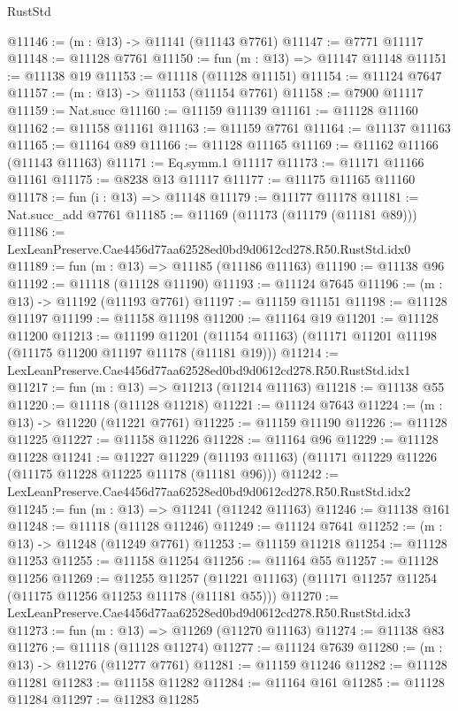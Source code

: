 \begin{lexlean}{RustStd}
\begin{coremodule}
@11146 := (m : @13) -> @11141 (@11143 @7761)
@11147 := @7771 @11117
@11148 := @11128 @7761
@11150 := fun (m : @13) => @11147 @11148
@11151 := @11138 @19
@11153 := @11118 (@11128 @11151)
@11154 := @11124 @7647
@11157 := (m : @13) -> @11153 (@11154 @7761)
@11158 := @7900 @11117
@11159 := Nat.succ
@11160 := @11159 @11139
@11161 := @11128 @11160
@11162 := @11158 @11161
@11163 := @11159 @7761
@11164 := @11137 @11163
@11165 := @11164 @89
@11166 := @11128 @11165
@11169 := @11162 @11166 (@11143 @11163)
@11171 := Eq.symm.{1} @11117
@11173 := @11171 @11166 @11161
@11175 := @8238 @13 @11117
@11177 := @11175 @11165 @11160
@11178 := fun (i : @13) => @11148
@11179 := @11177 @11178
@11181 := Nat.succ_add @7761
@11185 := @11169 (@11173 (@11179 (@11181 @89)))
@11186 := LexLeanPreserve.Cae4456d77aa62528ed0bd9d0612cd278.R50.RustStd.idx0
@11189 := fun (m : @13) => @11185 (@11186 @11163)
@11190 := @11138 @96
@11192 := @11118 (@11128 @11190)
@11193 := @11124 @7645
@11196 := (m : @13) -> @11192 (@11193 @7761)
@11197 := @11159 @11151
@11198 := @11128 @11197
@11199 := @11158 @11198
@11200 := @11164 @19
@11201 := @11128 @11200
@11213 := @11199
    @11201
    (@11154 @11163)
    (@11171 @11201 @11198 (@11175 @11200 @11197 @11178 (@11181 @19)))
@11214 := LexLeanPreserve.Cae4456d77aa62528ed0bd9d0612cd278.R50.RustStd.idx1
@11217 := fun (m : @13) => @11213 (@11214 @11163)
@11218 := @11138 @55
@11220 := @11118 (@11128 @11218)
@11221 := @11124 @7643
@11224 := (m : @13) -> @11220 (@11221 @7761)
@11225 := @11159 @11190
@11226 := @11128 @11225
@11227 := @11158 @11226
@11228 := @11164 @96
@11229 := @11128 @11228
@11241 := @11227
    @11229
    (@11193 @11163)
    (@11171 @11229 @11226 (@11175 @11228 @11225 @11178 (@11181 @96)))
@11242 := LexLeanPreserve.Cae4456d77aa62528ed0bd9d0612cd278.R50.RustStd.idx2
@11245 := fun (m : @13) => @11241 (@11242 @11163)
@11246 := @11138 @161
@11248 := @11118 (@11128 @11246)
@11249 := @11124 @7641
@11252 := (m : @13) -> @11248 (@11249 @7761)
@11253 := @11159 @11218
@11254 := @11128 @11253
@11255 := @11158 @11254
@11256 := @11164 @55
@11257 := @11128 @11256
@11269 := @11255
    @11257
    (@11221 @11163)
    (@11171 @11257 @11254 (@11175 @11256 @11253 @11178 (@11181 @55)))
@11270 := LexLeanPreserve.Cae4456d77aa62528ed0bd9d0612cd278.R50.RustStd.idx3
@11273 := fun (m : @13) => @11269 (@11270 @11163)
@11274 := @11138 @83
@11276 := @11118 (@11128 @11274)
@11277 := @11124 @7639
@11280 := (m : @13) -> @11276 (@11277 @7761)
@11281 := @11159 @11246
@11282 := @11128 @11281
@11283 := @11158 @11282
@11284 := @11164 @161
@11285 := @11128 @11284
@11297 := @11283
    @11285

\end{coremodule}
\end{lexlean}
